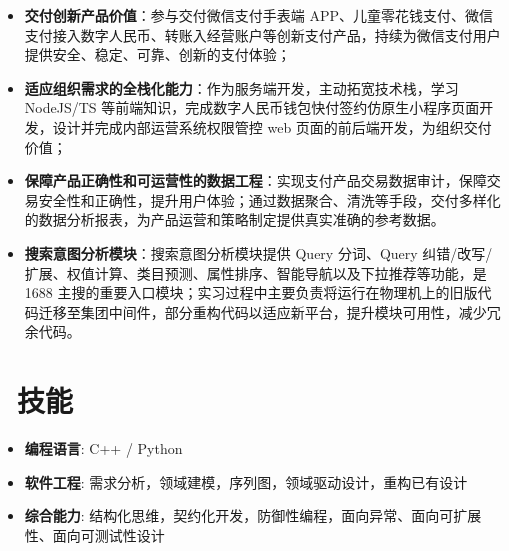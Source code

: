 \documentclass{resume}
\begin{document}
\begin{itemize}
  \item \textbf{交付创新产品价值}：参与交付微信支付手表端 APP、儿童零花钱支付、微信支付接入数字人民币、转账入经营账户等创新支付产品，持续为微信支付用户提供安全、稳定、可靠、创新的支付体验；
  \item \textbf{适应组织需求的全栈化能力}：作为服务端开发，主动拓宽技术栈，学习 NodeJS/TS 等前端知识，完成数字人民币钱包快付签约仿原生小程序页面开发，设计并完成内部运营系统权限管控 web 页面的前后端开发，为组织交付价值；
  \item \textbf{保障产品正确性和可运营性的数据工程}：实现支付产品交易数据审计，保障交易安全性和正确性，提升用户体验；通过数据聚合、清洗等手段，交付多样化的数据分析报表，为产品运营和策略制定提供真实准确的参考数据。
\end{itemize}

\begin{itemize}
  \item \textbf{搜索意图分析模块}：搜索意图分析模块提供 Query 分词、Query 纠错/改写/扩展、权值计算、类目预测、属性排序、智能导航以及下拉推荐等功能，是 1688 主搜的重要入口模块；实习过程中主要负责将运行在物理机上的旧版代码迁移至集团中间件，部分重构代码以适应新平台，提升模块可用性，减少冗余代码。
\end{itemize}

\section{\faCogs\ 技能}
\begin{itemize}[parsep=0.5ex]
  \item \textbf{编程语言}: C++ / Python
  \item \textbf{软件工程}: 需求分析，领域建模，序列图，领域驱动设计，重构已有设计
  \item \textbf{综合能力}: 结构化思维，契约化开发，防御性编程，面向异常、面向可扩展性、面向可测试性设计
\end{itemize}

\end{document}
